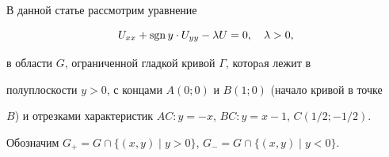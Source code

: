\maketitle 


\label{begin} 


 


 


В данной статье рассмотрим уравнение 


\begin{equation} 


U_{xx}+\sgn y\cdot U_{yy}-\lambda U=0,\quad \lambda>0, 


\end{equation} 


в области $G$, ограниченной гладкой кривой $\Gamma$, которaя лежит в 


полуплоскости $y>0$, с концами $A(0;0)$ и $B(1;0)$ (начало кривой в точке 


$B$) и отрезками характеристик $AC:y=-x$, $BC:y=x-1$, $C(1/2;-1/2)$. 


 


Обозначим $G_+=G\cap\{(x,y)\mid y>0\}$, $G_-=G\cap\{(x,y)\mid y<0\}$. 


\medskip 


 


